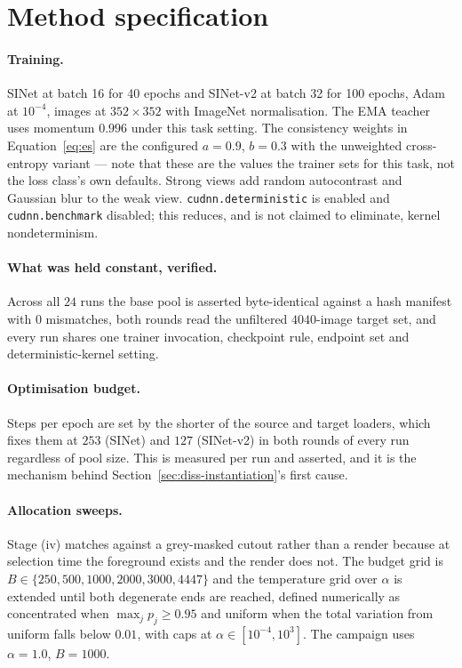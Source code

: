 \documentclass{article} %
\begin{document}
\appendix

\section{Method specification}
\label{app:method}

\paragraph{Training.} SINet at batch 16 for 40 epochs and SINet-v2 at batch 32 for 100 epochs, Adam at
$10^{-4}$, images at $352 \times 352$ with ImageNet normalisation. The EMA teacher uses momentum
$0.996$ under this task setting. The consistency weights in Equation~\ref{eq:es} are the configured
$a = 0.9$, $b = 0.3$ with the unweighted cross-entropy variant --- note that these are the values the
trainer sets for this task, not the loss class's own defaults. Strong views add random autocontrast
and Gaussian blur to the weak view. \texttt{cudnn.deterministic} is enabled and
\texttt{cudnn.benchmark} disabled; this reduces, and is not claimed to eliminate, kernel
nondeterminism.

\paragraph{What was held constant, verified.} Across all $24$ runs the base pool is asserted
byte-identical against a hash manifest with $0$ mismatches, both rounds read the unfiltered
$4040$-image target set, and every run shares one trainer invocation, checkpoint rule, endpoint set
and deterministic-kernel setting.

\paragraph{Optimisation budget.} Steps per epoch are set by the shorter of the source and target
loaders, which fixes them at $253$ (SINet) and $127$ (SINet-v2) in both rounds of every run regardless
of pool size. This is measured per run and asserted, and it is the mechanism behind
Section~\ref{sec:diss-instantiation}'s first cause.

\paragraph{Allocation sweeps.} Stage (iv) matches against a grey-masked cutout rather than a render
because at selection time the foreground exists and the render does not. The budget grid is $B \in \{250, 500, 1000, 2000, 3000, 4447\}$ and the
temperature grid over $\alpha$ is extended until both degenerate ends are reached, defined numerically
as concentrated when $\max_j p_j \geq 0.95$ and uniform when the total variation from uniform falls
below $0.01$, with caps at $\alpha \in [10^{-4}, 10^{3}]$. The campaign uses $\alpha = 1.0$, $B = 1000$.
\end{document}
